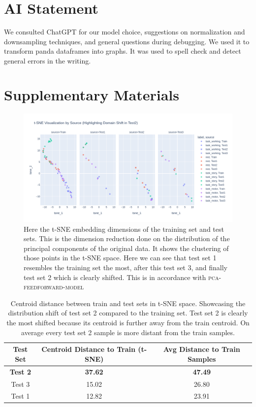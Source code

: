 \documentclass[conference]{IEEEtran}
\begin{document}
\section*{AI Statement}
We consulted ChatGPT for our model choice, suggestions on normalization and downsampling techniques, and general questions during debugging.  We used it to transform panda dataframes
into graphs. It was used to spell check and detect general errors in the writing.



\clearpage
\onecolumn

\section*{Supplementary Materials}
\begin{figure}[H]
    \centering
    \includegraphics[scale=.5]{figures/supplementary_distribution shift test set 2.png}
    \caption{Here the t-SNE  embedding dimensions of the training set and test sets. This is the dimension reduction done on the distribution of the principal components of the original data. It shows the clustering of those points in the t-SNE space. Here we can see that test set 1 resembles the training set the most, after this test set 3, and finally test set 2 which is clearly shifted. This is in accordance with \textsc{pca-feedforward-model}}
    \label{fig:tsne_distribution_shift}
\end{figure}

\begin{table}[H]
    \centering
    \begin{tabular}{|c|c|c|}
        \hline
        Test Set & Centroid Distance to Train (t-SNE) & Avg Distance to Train Samples \\
        \hline
        \textbf{Test 2} & \textbf{37.62} & \textbf{47.49} \\
        Test 3 & 15.02 & 26.80 \\
        Test 1 & 12.82 & 23.91 \\
        \hline
    \end{tabular}
    \caption{Centroid distance between train and test sets in t-SNE space. Showcasing the distribution shift of test set 2 compared to the training set. Test set 2 is clearly the most shifted because its centroid is further away from the train centroid. On average every test set 2 sample is more distant from the train samples.}
    \label{tab:centroid_distance}
\end{table}
\end{document}
